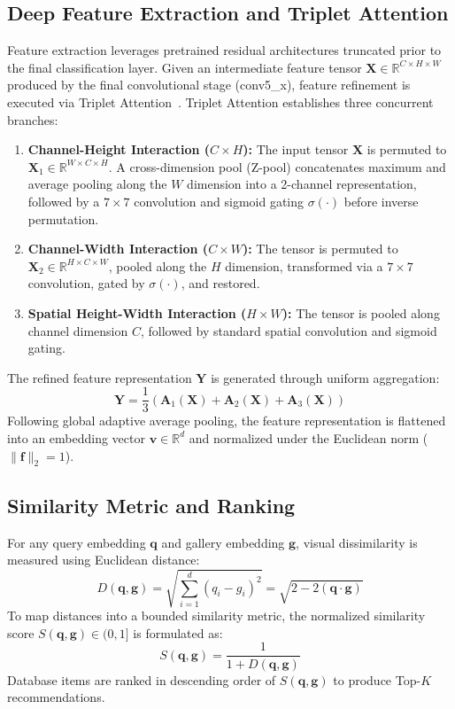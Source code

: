 \documentclass[runningheads]{llncs}
\begin{document}
\subsection{Deep Feature Extraction and Triplet Attention}
Feature extraction leverages pretrained residual architectures truncated prior to the final classification layer. Given an intermediate feature tensor $\mathbf{X} \in \mathbb{R}^{C \times H \times W}$ produced by the final convolutional stage (conv5\_x), feature refinement is executed via Triplet Attention~\cite{misra2021rotate}. Triplet Attention establishes three concurrent branches:
\begin{enumerate}
    \item \textbf{Channel-Height Interaction ($C \times H$):} The input tensor $\mathbf{X}$ is permuted to $\mathbf{X}_1 \in \mathbb{R}^{W \times C \times H}$. A cross-dimension pool (Z-pool) concatenates maximum and average pooling along the $W$ dimension into a 2-channel representation, followed by a $7 \times 7$ convolution and sigmoid gating $\sigma(\cdot)$ before inverse permutation.
    \item \textbf{Channel-Width Interaction ($C \times W$):} The tensor is permuted to $\mathbf{X}_2 \in \mathbb{R}^{H \times C \times W}$, pooled along the $H$ dimension, transformed via a $7 \times 7$ convolution, gated by $\sigma(\cdot)$, and restored.
    \item \textbf{Spatial Height-Width Interaction ($H \times W$):} The tensor is pooled along channel dimension $C$, followed by standard spatial convolution and sigmoid gating.
\end{enumerate}
The refined feature representation $\mathbf{Y}$ is generated through uniform aggregation:
\begin{equation}
    \mathbf{Y} = \frac{1}{3} \left( \mathbf{A}_1(\mathbf{X}) + \mathbf{A}_2(\mathbf{X}) + \mathbf{A}_3(\mathbf{X}) \right)
\end{equation}
Following global adaptive average pooling, the feature representation is flattened into an embedding vector $\mathbf{v} \in \mathbb{R}^d$ and normalized under the Euclidean norm ($\|\mathbf{f}\|_2 = 1$).

\subsection{Similarity Metric and Ranking}
For any query embedding $\mathbf{q}$ and gallery embedding $\mathbf{g}$, visual dissimilarity is measured using Euclidean distance:
\begin{equation}
    D(\mathbf{q}, \mathbf{g}) = \sqrt{\sum_{i=1}^d (q_i - g_i)^2} = \sqrt{2 - 2(\mathbf{q} \cdot \mathbf{g})}
\end{equation}
To map distances into a bounded similarity metric, the normalized similarity score $S(\mathbf{q}, \mathbf{g}) \in (0, 1]$ is formulated as:
\begin{equation}
    S(\mathbf{q}, \mathbf{g}) = \frac{1}{1 + D(\mathbf{q}, \mathbf{g})}
\end{equation}
Database items are ranked in descending order of $S(\mathbf{q}, \mathbf{g})$ to produce Top-$K$ recommendations.
\end{document}
